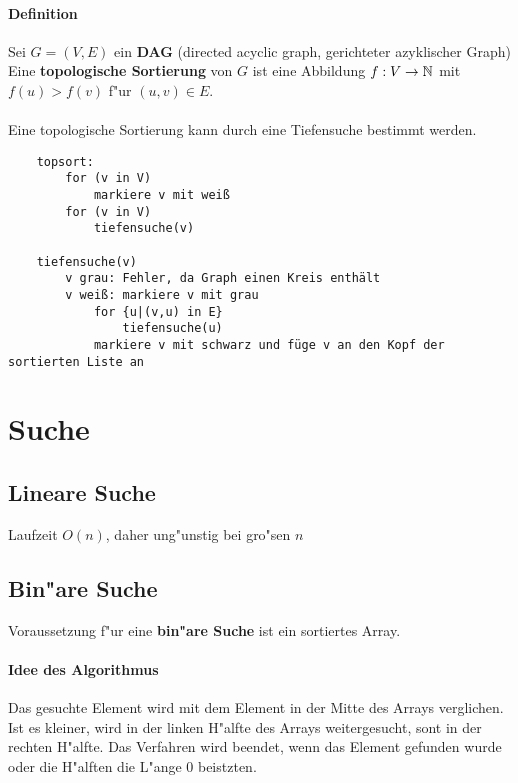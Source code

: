 \paragraph{Definition} Sei $G=(V,E)$ ein \textbf{DAG} (directed acyclic graph, gerichteter azyklischer Graph)\\
Eine \textbf{topologische Sortierung} von $G$ ist eine Abbildung $f:V\rightarrow\mathbb{N}$ mit $f(u)>f(v)$ f"ur $(u,v)\in E$.
\\
\\
Eine topologische Sortierung kann durch eine Tiefensuche bestimmt werden.
\begin{lstlisting}
    topsort:
        for (v in V)
            markiere v mit weiß
        for (v in V)
            tiefensuche(v)

    tiefensuche(v)
        v grau: Fehler, da Graph einen Kreis enthält
        v weiß: markiere v mit grau
            for {u|(v,u) in E}
                tiefensuche(u)
            markiere v mit schwarz und füge v an den Kopf der sortierten Liste an
\end{lstlisting}

\section{Suche}
\subsection{Lineare Suche}

Laufzeit \(O(n)\), daher ung"unstig bei gro"sen \(n\)

\subsection{Bin"are Suche}

Voraussetzung f"ur eine \textbf{bin"are Suche} ist ein sortiertes Array.

\paragraph{Idee des Algorithmus}
Das gesuchte Element wird mit dem Element in der Mitte des Arrays verglichen. Ist es kleiner, wird in der linken H"alfte des Arrays weitergesucht,
sont in der rechten H"alfte. Das Verfahren wird beendet, wenn das Element gefunden wurde oder die H"alften die L"ange 0 beistzten.

